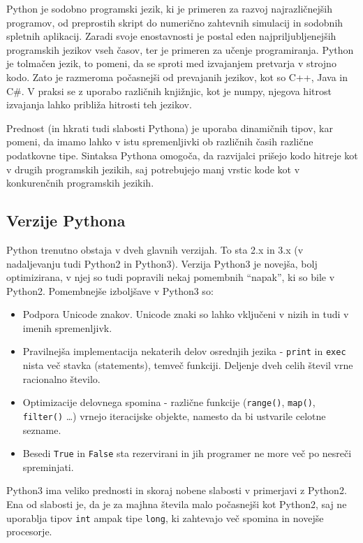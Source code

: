 Python je sodobno programski jezik, ki je primeren za razvoj najrazličnejših programov, od preprostih skript do numerično zahtevnih simulacij in sodobnih spletnih aplikacij. Zaradi svoje enostavnosti je postal eden najpriljubljenejših programskih jezikov vseh časov, ter je primeren za učenje programiranja. Python je tolmačen jezik, to pomeni, da se sproti med izvajanjem pretvarja v strojno kodo.\cite{rin} Zato je razmeroma počasnejši od prevajanih jezikov, kot so C++, Java in C\#. V praksi se z uporabo različnih knjižnjic, kot je numpy, njegova hitrost izvajanja lahko približa hitrosti teh jezikov.

    Prednost (in hkrati tudi slabosti Pythona) je uporaba dinamičnih tipov, kar pomeni, da imamo lahko v istu spremenljivki ob različnih časih različne podatkovne tipe. Sintaksa Pythona omogoča, da razvijalci prišejo kodo hitreje kot v drugih programskih jezikih, saj potrebujejo manj vrstic kode kot v konkurenčnih programskih jezikih.

    \subsection{Verzije Pythona}
        Python trenutno obstaja v dveh glavnih verzijah. To sta 2.x in 3.x (v nadaljevanju tudi Python2 in Python3). Verzija Python3 je novejša, bolj optimizirana, v njej so tudi popravili nekaj pomembnih ``napak'', ki so bile v Python2. Pomembnejše izboljšave v Python3 so:
        \begin{itemize}
            \item Podpora Unicode znakov. Unicode znaki so lahko vključeni v nizih in tudi v imenih spremenljivk.
            \item Pravilnejša implementacija nekaterih delov osrednjih jezika - \texttt{print} in \texttt{exec} nista več stavka (statements), temveč funkciji. Deljenje dveh celih števil vrne racionalno število.
            \item Optimizacije delovnega spomina - različne funkcije (\texttt{range()}, \texttt{map()}, \texttt{filter()} \ldots) vrnejo iteracijske objekte, namesto da bi ustvarile celotne sezname.
            \item Besedi \texttt{True} in \texttt{False} sta rezervirani in jih programer ne more več po nesreči spreminjati.
        \end{itemize}

        Python3 ima veliko prednosti in skoraj nobene slabosti v primerjavi z Python2. Ena od slabosti je, da je za majhna števila malo počasnejši kot Python2, saj ne uporablja tipov \texttt{int} ampak tipe \texttt{long}, ki zahtevajo več spomina in novejše procesorje.


